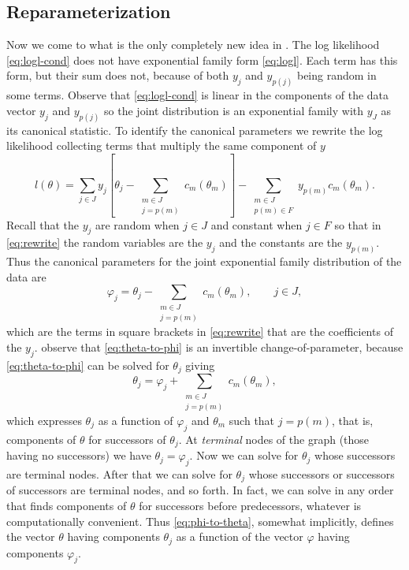 \documentclass[11pt]{article}
\begin{document}
\subsection{Reparameterization} \label{sec:geyer-great-idea}

Now we come to what is the only completely new idea in \citet{gws}.
The log likelihood \eqref{eq:logl-cond} does not have exponential family form
\eqref{eq:logl}.  Each term has this form, but their sum does not, because of
both $y_j$ and $y_{p(j)}$ being random in some terms.
Observe that
\eqref{eq:logl-cond} is linear in the components of the data
vector $y_j$ and $y_{p(j)}$ so the joint distribution
is an exponential family with $y_J$ as its canonical statistic.  To identify
the canonical parameters we rewrite the log likelihood collecting terms that
multiply the same component of $y$
\begin{equation} \label{eq:rewrite}
   l(\theta)
   =
   \sum_{j \in J} y_j \left[
   \theta_j - \sum_{\substack{m \in J \\ j = p(m)}} c_m(\theta_m) \right]
   -
   \sum_{\substack{m \in J \\ p(m) \in F}} y_{p(m)} c_m(\theta_m).
\end{equation}
Recall that the $y_j$ are random when $j \in J$ and constant when $j \in F$
so that in \eqref{eq:rewrite} the random variables are the $y_j$ and the
constants are the $y_{p(m)}$.  Thus the canonical parameters for the
joint exponential family distribution of the data are
\begin{equation} \label{eq:theta-to-phi}
   \varphi_j = \theta_j - \sum_{\substack{m \in J \\ j = p(m)}} c_m(\theta_m),
   \qquad j \in J,
\end{equation}
which are the terms in square brackets in \eqref{eq:rewrite} that are the
coefficients of the $y_j$.  \citet{gws} observe that \eqref{eq:theta-to-phi}
is an invertible change-of-parameter, because \eqref{eq:theta-to-phi} can
be solved for $\theta_j$ giving
\begin{equation} \label{eq:phi-to-theta}
   \theta_j = \varphi_j + \sum_{\substack{m \in J \\ j = p(m)}} c_m(\theta_m),
\end{equation}
which expresses $\theta_j$ as a function of $\varphi_j$ and $\theta_m$ such
that $j = p(m)$, that is, components of $\theta$ for successors of $\theta_j$.
At \emph{terminal}
nodes of the graph (those having no successors) we have $\theta_j = \varphi_j$.
Now we can solve for $\theta_j$ whose successors are terminal nodes.
After that we can solve for $\theta_j$ whose successors or successors of
successors are terminal nodes, and so forth.
In fact, we can solve in any order
that finds components of $\theta$ for successors before predecessors,
whatever is computationally
convenient.  Thus \eqref{eq:phi-to-theta}, somewhat implicitly, defines
the vector $\theta$ having components $\theta_j$ as a function of
the vector $\varphi$ having components $\varphi_j$.
\end{document}

